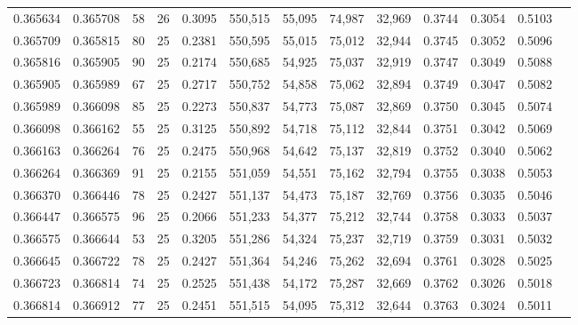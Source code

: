\begin{tabular}{rrrrrrrrrrrrr}
0.365634 & 0.365708 &    58 &  26 &                                     0.3095 & 550,515 &  55,095 &  74,987 &  32,969 & 0.3744 & 0.3054 & 0.5103 \\
0.365709 & 0.365815 &    80 &  25 &                                     0.2381 & 550,595 &  55,015 &  75,012 &  32,944 & 0.3745 & 0.3052 & 0.5096 \\
0.365816 & 0.365905 &    90 &  25 &                                     0.2174 & 550,685 &  54,925 &  75,037 &  32,919 & 0.3747 & 0.3049 & 0.5088 \\
0.365905 & 0.365989 &    67 &  25 &                                     0.2717 & 550,752 &  54,858 &  75,062 &  32,894 & 0.3749 & 0.3047 & 0.5082 \\
0.365989 & 0.366098 &    85 &  25 &                                     0.2273 & 550,837 &  54,773 &  75,087 &  32,869 & 0.3750 & 0.3045 & 0.5074 \\
0.366098 & 0.366162 &    55 &  25 &                                     0.3125 & 550,892 &  54,718 &  75,112 &  32,844 & 0.3751 & 0.3042 & 0.5069 \\
0.366163 & 0.366264 &    76 &  25 &                                     0.2475 & 550,968 &  54,642 &  75,137 &  32,819 & 0.3752 & 0.3040 & 0.5062 \\
0.366264 & 0.366369 &    91 &  25 &                                     0.2155 & 551,059 &  54,551 &  75,162 &  32,794 & 0.3755 & 0.3038 & 0.5053 \\
0.366370 & 0.366446 &    78 &  25 &                                     0.2427 & 551,137 &  54,473 &  75,187 &  32,769 & 0.3756 & 0.3035 & 0.5046 \\
0.366447 & 0.366575 &    96 &  25 &                                     0.2066 & 551,233 &  54,377 &  75,212 &  32,744 & 0.3758 & 0.3033 & 0.5037 \\
0.366575 & 0.366644 &    53 &  25 &                                     0.3205 & 551,286 &  54,324 &  75,237 &  32,719 & 0.3759 & 0.3031 & 0.5032 \\
0.366645 & 0.366722 &    78 &  25 &                                     0.2427 & 551,364 &  54,246 &  75,262 &  32,694 & 0.3761 & 0.3028 & 0.5025 \\
0.366723 & 0.366814 &    74 &  25 &                                     0.2525 & 551,438 &  54,172 &  75,287 &  32,669 & 0.3762 & 0.3026 & 0.5018 \\
0.366814 & 0.366912 &    77 &  25 &                                     0.2451 & 551,515 &  54,095 &  75,312 &  32,644 & 0.3763 & 0.3024 & 0.5011 \\

\end{tabular}
